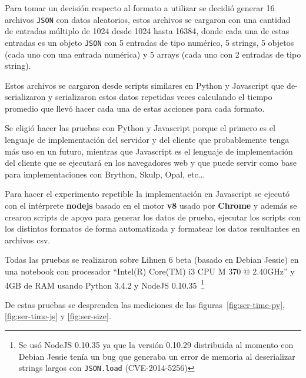 Para tomar un decisión respecto al formato a utilizar se decidió generar
16 archivos \texttt{JSON} con datos aleatorios, estos archivos se cargaron
con una cantidad de entradas múltiplo de 1024 desde 1024 hasta 16384, donde
cada una de estas entradas es un objeto \texttt{JSON} con 5 entradas de tipo
numérico, 5 strings, 5 objetos (cada uno con una entrada numérica) y 5
arrays (cada uno con 2 entradas de tipo string).

Estos archivos se cargaron desde scripts similares en Python y Javascript que
de-serializaron y serializaron estos datos repetidas veces calculando el tiempo
promedio que llevó hacer cada una de estas acciones para cada formato.

Se eligió hacer las pruebas con Python y Javascript porque el primero es el
lenguaje de implementación del servidor y del cliente que probablemente tenga
más uso en un futuro, mientras que Javascript es el lenguaje de implementación
del cliente que se ejecutará en los navegadores web y que puede servir como
base para implementaciones con Brython, Skulp, Opal, etc...

Para hacer el experimento repetible la implementación en
Javascript se ejecutó con el intérprete \textbf{nodejs} basado en
el motor \textbf{v8} usado por \textbf{Chrome} y además se crearon
scripts de apoyo para generar los datos de prueba, ejecutar los scripts
con los distintos formatos de forma automatizada y formatear los datos
resultantes en archivos csv.

Todas las pruebas se realizaron sobre Lihuen 6 beta (basado en Debian Jessie)
en una notebook con procesador ``Intel(R) Core(TM) i3 CPU M 370 @ 2.40GHz''
y 4GB de RAM %
usando Python 3.4.2 y NodeJS 0.10.35~\footnote{Se usó NodeJS 0.10.35 ya que
la versión 0.10.29 distribuida al momento con Debian Jessie tenía un bug que
generaba un error de memoria al
deserializar strings largos con \texttt{JSON.load} (CVE-2014-5256)}

De estas pruebas se desprenden las mediciones de las
figuras~\ref{fig:ser-time-py}, \ref{fig:ser-time-js} y \ref{fig:ser-size}.

